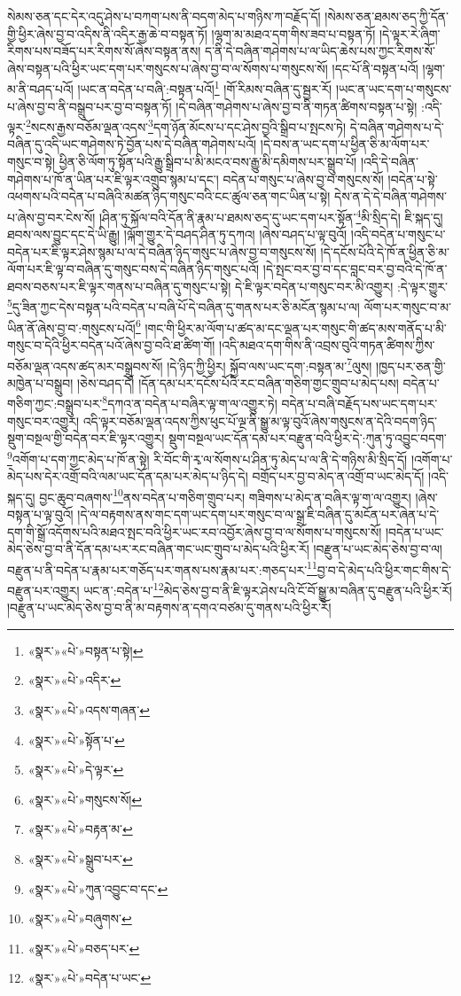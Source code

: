 སེམས་ཅན་དང་དེར་འདུ་ཤེས་པ་བཀག་པས་ནི་བདག་མེད་པ་གཉིས་ཀ་བརྗོད་དོ། །སེམས་ཅན་ཐམས་ཅད་ཀྱི་དོན་གྱི་ཕྱིར་ཞེས་བྱ་བ་འདིས་ནི་འདིར་རྒྱ་ཆེ་བ་བསྟན་ཏོ། །ལྷག་མ་མཐའ་དག་གིས་ཟབ་པ་བསྟན་ཏོ། །དེ་ལྟར་རེ་ཞིག་རིགས་པས་བཟོད་པར་རིགས་སོ་ཞེས་བསྟན་ནས། ད་ནི་དེ་བཞིན་གཤེགས་པ་ལ་ཡིད་ཆེས་པས་ཀྱང་རིགས་སོ་ཞེས་བསྟན་པའི་ཕྱིར་ཡང་དག་པར་གསུངས་པ་ཞེས་བྱ་བ་ལ་སོགས་པ་གསུངས་སོ། །དང་པོ་ནི་བསྟན་པའོ། །ལྷག་མ་ནི་བཤད་པའོ། །ཡང་ན་བདེན་པ་བཞི་:བསྟན་པའོ།\footnote{«སྣར་»«པེ་»བསྟན་པ་སྟེ།} །གོ་རིམས་བཞིན་དུ་སྦྱར་རོ། །ཡང་ན་ཡང་དག་པ་གསུངས་པ་ཞེས་བྱ་བ་ནི་བསྒྲུབ་པར་བྱ་བ་བསྟན་ཏོ། །དེ་བཞིན་གཤེགས་པ་ཞེས་བྱ་བ་ནི་གཏན་ཚིགས་བསྟན་པ་སྟེ། :འདི་ལྟར་\footnote{«སྣར་»«པེ་»འདིར་}སངས་རྒྱས་བཅོམ་ལྡན་འདས་\footnote{«སྣར་»«པེ་»འདས་གཞན་}དག་ཉོན་མོངས་པ་དང་ཤེས་བྱའི་སྒྲིབ་པ་སྤངས་ཏེ། དེ་བཞིན་གཤེགས་པ་དེ་བཞིན་དུ་འདི་ཡང་གཤེགས་ཏེ་བྱོན་པས་དེ་བཞིན་གཤེགས་པའོ། །དེ་བས་ན་ཡང་དག་པ་ཕྱིན་ཅི་མ་ལོག་པར་གསུང་བ་སྟེ། ཕྱིན་ཅི་ལོག་ཏུ་སྟོན་པའི་རྒྱུ་སྒྲིབ་པ་མི་མངའ་བས་རྒྱུ་མི་དམིགས་པར་སྒྲུབ་པོ། །འདི་དེ་བཞིན་གཤེགས་པ་ཁོ་ན་ཡིན་པར་ཇི་ལྟར་འགྲུབ་སྙམ་པ་དང་། བདེན་པ་གསུང་པ་ཞེས་བྱ་བ་གསུངས་སོ། །བདེན་པ་སྟེ་འཕགས་པའི་བདེན་པ་བཞིའི་མཚན་ཉིད་གསུང་བའི་ངང་ཚུལ་ཅན་གང་ཡིན་པ་སྟེ། དེས་ན་དེ་དེ་བཞིན་གཤེགས་པ་ཞེས་བྱ་བར་ངེས་སོ། །ཤིན་ཏུ་སྐོལ་བའི་དོན་ནི་རྣམ་པ་ཐམས་ཅད་དུ་ཡང་དག་པར་སྟོན་\footnote{«སྣར་»«པེ་»སྟོན་པ་}མི་སྲིད་དེ། ཇི་སྐད་དུ། ཐབས་ལས་བྱུང་དང་དེ་ཡི་རྒྱུ། །ལྐོག་གྱུར་དེ་བཤད་ཤིན་ཏུ་དཀའ། །ཞེས་བཤད་པ་ལྟ་བུའོ། །འདི་བདེན་པ་གསུང་པ་བདེན་པར་ཇི་ལྟར་ཤེས་སྙམ་པ་ལ་དེ་བཞིན་ཉིད་གསུང་པ་ཞེས་བྱ་བ་གསུངས་སོ། །དེ་དངོས་པོའི་དེ་ཁོ་ན་ཕྱིན་ཅི་མ་ལོག་པར་ཇི་ལྟ་བ་བཞིན་དུ་གསུང་བས་དེ་བཞིན་ཉིད་གསུང་པའོ། །དེ་སྤང་བར་བྱ་བ་དང་བླང་བར་བྱ་བའི་དེ་ཁོ་ན་ཐབས་བཅས་པར་ཇི་ལྟར་གནས་པ་བཞིན་དུ་གསུང་པ་སྟེ། དེ་ཇི་ལྟར་བདེན་པ་གསུང་བར་མི་འགྱུར། :དེ་ལྟར་གྱུར་\footnote{«སྣར་»«པེ་»དེ་ལྟར་}དུ་ཟིན་ཀྱང་དེས་བསྟན་པའི་བདེན་པ་བཞི་པོ་དེ་བཞིན་དུ་གནས་པར་ཅི་མངོན་སྙམ་པ་ལ། ལོག་པར་གསུང་བ་མ་ཡིན་ནོ་ཞེས་བྱ་བ་:གསུངས་པའོ།\footnote{«སྣར་»«པེ་»གསུངས་སོ།} །གང་གི་ཕྱིར་མ་ལོག་པ་ཚད་མ་དང་ལྡན་པར་གསུང་གི་ཚད་མས་གནོད་པ་མི་གསུང་བ་དེའི་ཕྱིར་བདེན་པའོ་ཞེས་བྱ་བའི་ཐ་ཚིག་གོ། །འདི་མཐའ་དག་གིས་ནི་འབྲས་བུའི་གཏན་ཚིགས་ཀྱིས་བཅོམ་ལྡན་འདས་ཚད་མར་བསྒྲུབས་སོ། །དེ་ཉིད་ཀྱི་ཕྱིར། སྐྱོབ་ལས་ཡང་དག་:བསྟན་མ་\footnote{«སྣར་»«པེ་»བརྟན་མ་}ལུས། །ཁྱད་པར་ཅན་གྱི་མཁྱེན་པ་བསྒྲུབ། །ཅེས་བཤད་དོ། །དོན་དམ་པར་དངོས་པོའི་རང་བཞིན་གཅིག་གྱང་གྲུབ་པ་མེད་པས། བདེན་པ་གཅིག་ཀྱང་:བསྒྲུབ་པར་\footnote{«སྣར་»«པེ་»སྒྲུབ་པར་}དཀའ་ན་བདེན་པ་བཞིར་ལྟ་ག་ལ་འགྱུར་ཏེ། བདེན་པ་བཞི་བརྗོད་པས་ཡང་དག་པར་གསུང་བར་འགྱུར། འདི་ལྟར་བཅོམ་ལྡན་འདས་ཀྱིས་ཕུང་པོ་ལྔ་ནི་སྒྱུ་མ་ལྟ་བུའོ་ཞེས་གསུངས་ན་དེའི་བདག་ཉིད་སྡུག་བསྔལ་གྱི་བདེན་བར་ཇི་ལྟར་འགྱུར། སྡུག་བསྔལ་ཡང་དོན་དམ་པར་བརྫུན་བའི་ཕྱིར་དེ་:ཀུན་ཏུ་འབྱུང་བདག་\footnote{«སྣར་»«པེ་»ཀུན་འབྱུང་བ་དང་}འགོག་པ་དག་ཀྱང་མེད་པ་ཁོ་ན་སྟེ། རི་བོང་གི་རྭ་ལ་སོགས་པ་ཤིན་ཏུ་མེད་པ་ལ་ནི་དེ་གཉིས་མི་སྲིད་དོ། །འགོག་པ་མེད་པས་དེར་འགྲོ་བའི་ལམ་ཡང་དོན་དམ་པར་མེད་པ་ཉིད་དེ། བགྲོད་པར་བྱ་བ་མེད་ན་འགྲོ་བ་ཡང་མེད་དོ། །འདི་སྐད་དུ། བྱང་ཆུབ་བཞགས་\footnote{«སྣར་»«པེ་»བཞུགས་}ནས་བདེན་པ་གཅིག་གྲུབ་པར། གཟིགས་པ་མེད་ན་བཞིར་ལྟ་ག་ལ་འགྱུར། །ཞེས་བསྟན་པ་ལྟ་བུའོ། །དེ་ལ་བརྟགས་ནས་གང་དག་ཡང་དག་པར་གསུང་བ་ལ་སྒྲ་ཇི་བཞིན་དུ་མངོན་པར་ཞེན་པ་དེ་དག་གི་སྒྲོ་འདོགས་པའི་མཐའ་སྤང་བའི་ཕྱིར་ཡང་རབ་འབྱོར་ཞེས་བྱ་བ་ལ་སོགས་པ་གསུངས་སོ། །བདེན་པ་ཡང་མེད་ཅེས་བྱ་བ་ནི་དོན་དམ་པར་རང་བཞིན་གང་ཡང་གྲུབ་པ་མེད་པའི་ཕྱིར་རོ། །བརྫུན་པ་ཡང་མེད་ཅེས་བྱ་བ་ལ། བརྫུན་པ་ནི་བདེན་པ་རྣམ་པར་གཅོད་པར་གནས་པས་རྣམ་པར་:གཅད་པར་\footnote{«སྣར་»«པེ་»བཅད་པར་}བྱ་བ་དེ་མེད་པའི་ཕྱིར་གང་གིས་དེ་བརྫུན་པར་འགྱུར། ཡང་ན་:བདེན་པ་\footnote{«སྣར་»«པེ་»བདེན་པ་ཡང་}མེད་ཅེས་བྱ་བ་ནི་ཇི་ལྟར་ཤེས་པའི་ངོ་བོ་སྒྱུ་མ་བཞིན་དུ་བརྫུན་པའི་ཕྱིར་རོ། །བརྫུན་པ་ཡང་མེད་ཅེས་བྱ་བ་ནི་མ་བརྟགས་ན་དགའ་བཙམ་དུ་གནས་པའི་ཕྱིར་རོ། 
